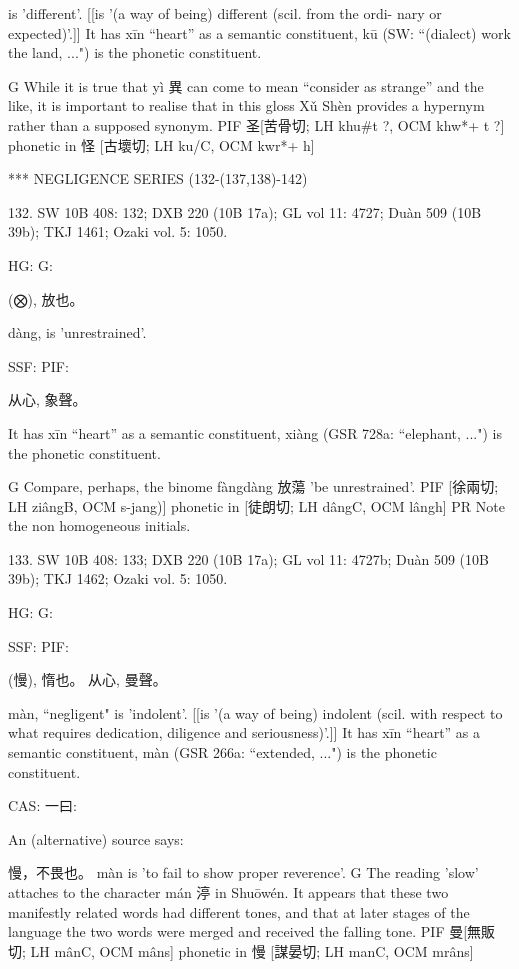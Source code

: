 is 'different'. [[is '(a way of being) different (scil. from the ordi- nary or expected)'.]]
It has xīn ``heart'' as a semantic constituent,
kū (SW: ``(dialect) work the land, ...") is the phonetic constituent.

G	While it is true that yì 異 can come to mean ``consider as strange'' and the like, it is important to realise that in this gloss Xǔ Shèn provides a hypernym rather than a supposed synonym.
PIF     圣[苦骨切; LH khu\#t ?, OCM khw*+ t ?] phonetic in 怪 [古壞切; LH ku/C, OCM kwr*+ h]

***
NEGLIGENCE SERIES (132-(137,138)-142)

132. SW 10B 408: 132; DXB 220 (10B 17a); GL vol 11: 4727; Duàn 509 (10B 39b); TKJ 1461; Ozaki vol. 5: 1050.


HG:
G:

(⨂),
放也。

dàng,
is 'unrestrained'.




SSF: PIF:

从心, 象聲。

It has xīn ``heart'' as a semantic constituent,
xiàng (GSR 728a: ``elephant, ...") is the phonetic constituent.

G	Compare, perhaps, the binome fàngdàng 放蕩 'be unrestrained'.
PIF     [徐兩切; LH ziângB, OCM s-jang)] phonetic in [徒朗切; LH dângC, OCM lângh]
PR	Note the non homogeneous initials.


133. SW 10B 408: 133; DXB 220 (10B 17a); GL vol 11: 4727b; Duàn 509 (10B 39b); TKJ 1462; Ozaki vol. 5: 1050.


HG:
G:

SSF: PIF:

(慢),
惰也。
从心,
曼聲。


màn, ``negligent"
is 'indolent'. [[is '(a way of being) indolent (scil. with respect to what requires dedication, diligence and seriousness)'.]]
It has xīn ``heart'' as a semantic constituent,
màn (GSR 266a: ``extended, ...") is the phonetic constituent.

CAS: 一曰:

An (alternative) source says:

慢，不畏也。 màn is 'to fail to show proper reverence'.
G The reading 'slow' attaches to the character mán 渟 in Shuōwén. It appears that these two manifestly related words had different tones, and that at later stages of the language the two words were merged and received the falling tone.
PIF    曼[無販切; LH mânC, OCM mâns] phonetic in 慢 [謀晏切; LH manC, OCM mrâns]

